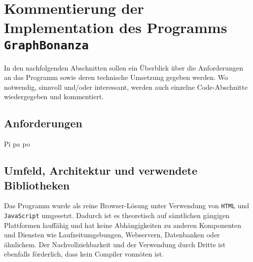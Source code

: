 \documentclass[11pt,abstracton]{scrreprt} %
\theoremstyle{definition}
\begin{document}
\begin{figure}


\end{figure}








\chapter{Kommentierung der Implementation des Programms {\tt GraphBonanza}}

In den nachfolgenden Abschnitten sollen ein Überblick über die Anforderungen an das Programm sowie deren technische Umsetzung gegeben werden. Wo notwendig, sinnvoll und/oder interessant, werden auch einzelne Code-Abschnitte wiedergegeben und kommentiert.

\section{Anforderungen}

Pi pa po

\section{Umfeld, Architektur und verwendete Bibliotheken}

Das Programm wurde als reine Browser-Lösung unter Verwendung von {\tt HTML} und {\tt JavaScript} umgesetzt. Dadurch ist es theoretisch auf sämtlichen gängigen Plattformen lauffähig und hat keine Abhängigkeiten zu anderen Komponenten und Diensten wie Laufzeitumgebungen, Webservern, Datenbanken oder ähnlichem. Der Nachvollziehbarkeit und der Verwendung durch Dritte ist ebenfalls förderlich, dass kein Compiler vonnöten ist.
\end{document}
